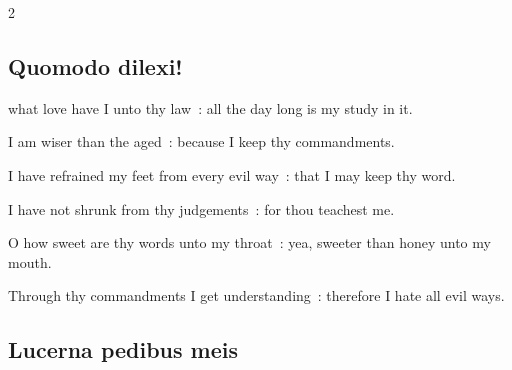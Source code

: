 \begin{multicols}{2}

\subsection{Quomodo dilexi!}


 what love have I unto thy law~: all the day long is my study in it.\par
{}
I am wiser than the aged~: because I keep thy commandments.\par
{}I have refrained my feet from every evil way~: that I may keep thy word.\par
{}I have not shrunk from thy judgements~: for thou teachest me.\par
{}O how sweet are thy words unto my throat~: yea, sweeter than honey unto my mouth.\par
{}Through thy commandments I get understanding~: therefore I hate all evil ways.\par

\vspace{-0.75\baselineskip}

\subsection{Lucerna pedibus meis}

\vspace{-0.25\baselineskip}


\end{multicols}
